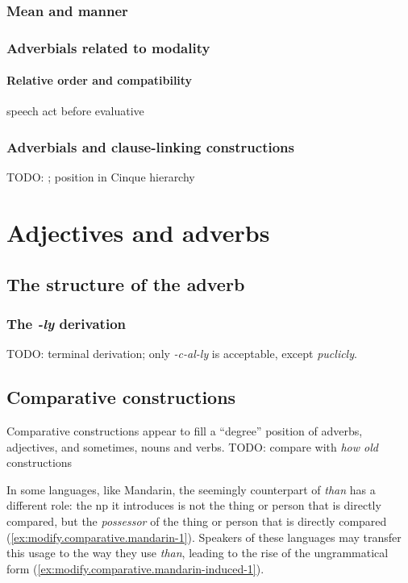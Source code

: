 \documentclass[UTF8, a4paper, oneside, scheme=plain, 12pt]{ctexbook}
\newcommand*{\citesec}[1]{\S~{#1}}
\newcommand*{\citechap}[1]{Ch.~{#1}}
\newcommand*{\citepage}[1]{p.~{#1}}
\newcommand{\form}[1]{\emph{#1}}
\begin{document}
\subsection{Mean and manner}

\subsection{Adverbials related to modality}


\subsubsection{Relative order and compatibility}

speech act before evaluative \citep[\citepage{106}]{cinque1999adverbs}

\subsection{Adverbials and clause-linking constructions}

TODO: \citet[\citechap{8}, \citesec{12}]{cgel}; position in Cinque hierarchy

\chapter{Adjectives and adverbs}

\section{The structure of the adverb}

\subsection{The \form{-ly} derivation}

TODO: terminal derivation; only \form{-c-al-ly} is acceptable,
except \form{puclicly}.

\section{Comparative constructions}

Comparative constructions appear to fill a ``degree'' position
of adverbs, adjectives, and sometimes, nouns and verbs.
TODO: compare with \form{how old} constructions  

In some languages, like Mandarin, 
the seemingly counterpart of \form{than} 
has a different role: 
the \acs{np} it introduces is not the thing or person that is directly compared, 
but the \emph{possessor} of the thing or person that is directly compared
(\ref{ex:modify.comparative.mandarin-1}).
Speakers of these languages may transfer this usage 
to the way they use \form{than},
leading to the rise of the ungrammatical form (\ref{ex:modify.comparative.mandarin-induced-1}).
\end{document}
